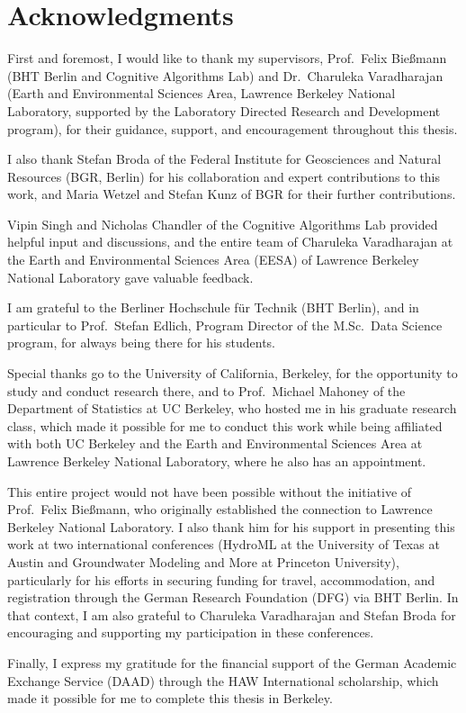 \chapter*{Acknowledgments}

First and foremost, I would like to thank my supervisors, 
Prof.\ Felix Bie\ss{}mann (BHT Berlin and Cognitive Algorithms Lab) 
and Dr.\ Charuleka Varadharajan (Earth and Environmental Sciences Area, 
Lawrence Berkeley National Laboratory, supported by the Laboratory 
Directed Research and Development program), for their guidance, 
support, and encouragement throughout this thesis.

I also thank Stefan Broda of the Federal Institute for Geosciences
and Natural Resources (BGR, Berlin) for his collaboration and
expert contributions to this work, and Maria Wetzel and Stefan Kunz
of BGR for their further contributions.

Vipin Singh and Nicholas Chandler of the 
Cognitive Algorithms Lab provided helpful input and discussions, 
and the entire team of Charuleka Varadharajan at the 
Earth and Environmental Sciences Area (EESA) of Lawrence Berkeley 
National Laboratory gave valuable feedback.

I am grateful to the Berliner Hochschule f{\"u}r Technik (BHT Berlin), and in particular 
to Prof.\ Stefan Edlich, Program Director of the M.Sc.\ Data Science 
program, for always being there for his students.

Special thanks go to the University of California, Berkeley, for 
the opportunity to study and conduct research there, and to
Prof.\ Michael Mahoney of the Department of Statistics 
at UC Berkeley, who hosted me in his graduate research class, which
made it possible for me to conduct this work while being 
affiliated with both UC Berkeley and the Earth and Environmental 
Sciences Area at Lawrence Berkeley National Laboratory, where he also
has an appointment.

This entire project would not have been possible without the initiative
of Prof.\ Felix Bie\ss{}mann, who originally established the connection
to Lawrence Berkeley National Laboratory. I also thank him
for his support in presenting this work at two international 
conferences (HydroML at the University of Texas at Austin and 
Groundwater Modeling and More at Princeton University), particularly
for his efforts in securing funding for travel, accommodation, and 
registration through the German Research Foundation (DFG) via 
BHT Berlin. In that context, I am also grateful to Charuleka Varadharajan 
and  Stefan Broda for encouraging and supporting my participation in 
these conferences.

Finally, I express my gratitude for the financial support of the German 
Academic Exchange Service (DAAD) through the HAW International
scholarship, which made it possible for me to complete this 
thesis in Berkeley.
